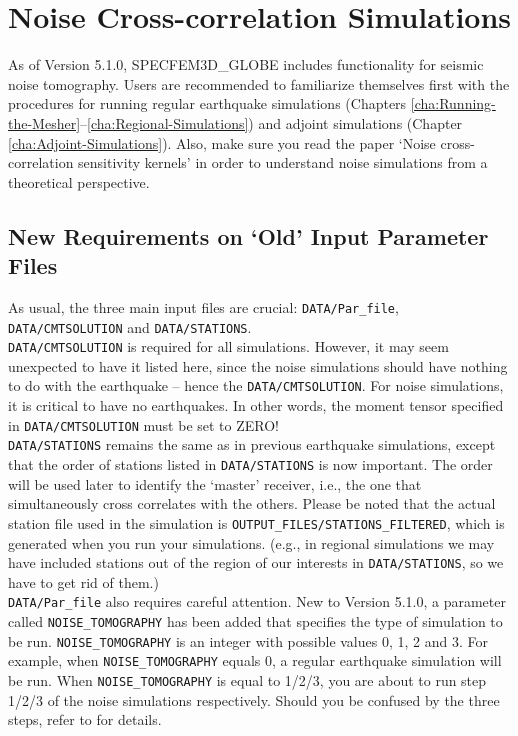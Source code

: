 \documentclass[oneside,english]{book}
\begin{document}
\chapter{Noise Cross-correlation Simulations}

As of Version 5.1.0, SPECFEM3D\_GLOBE includes functionality for seismic noise tomography.
Users are recommended to familiarize themselves first with the procedures for running regular earthquake
simulations (Chapters \ref{cha:Running-the-Mesher}--\ref{cha:Regional-Simulations}) and
adjoint simulations (Chapter \ref{cha:Adjoint-Simulations}).
Also, make sure you read the paper `Noise cross-correlation sensitivity kernels' \citep{trompetal2010}
in order to understand noise simulations from a theoretical perspective.

\section{New Requirements on `Old' Input Parameter Files}

As usual, the three main input files are crucial: \texttt{DATA/Par\_file}, \texttt{DATA/CMTSOLUTION} and
\texttt{DATA/STATIONS}.\\

\texttt{DATA/CMTSOLUTION} is required for all simulations. However, it may seem unexpected to have it listed here, since the
noise simulations should have nothing to do with the earthquake -- hence the \texttt{DATA/CMTSOLUTION}.
For noise simulations, it is critical to have no earthquakes. In other words, the moment tensor
specified in \texttt{DATA/CMTSOLUTION} must be set to ZERO! \\

\texttt{DATA/STATIONS} remains the same as in previous earthquake simulations,
except that the order of stations listed in \texttt{DATA/STATIONS} is now important.
The order will be used later to identify the `master' receiver,
i.e., the one that simultaneously cross correlates with the others.
Please be noted that the actual station file used in the simulation is \texttt{OUTPUT\_FILES/STATIONS\_FILTERED},
which is generated when you run your simulations. (e.g., in regional simulations we may have included stations out of the
region of our interests in \texttt{DATA/STATIONS}, so we have to get rid of them.)\\

\texttt{DATA/Par\_file} also requires careful attention.
New to Version 5.1.0, a parameter called \texttt{NOISE\_TOMOGRAPHY} has been added that specifies the type of simulation to be run.
\texttt{NOISE\_TOMOGRAPHY} is an integer with possible values 0, 1, 2 and 3.
For example, when \texttt{NOISE\_TOMOGRAPHY} equals 0, a regular earthquake simulation will be run.
When \texttt{NOISE\_TOMOGRAPHY} is equal to 1/2/3, you are about to run
step 1/2/3 of the noise simulations respectively.
Should you be confused by the three steps, refer to \citet{trompetal2010} for details.\\
\end{document}
